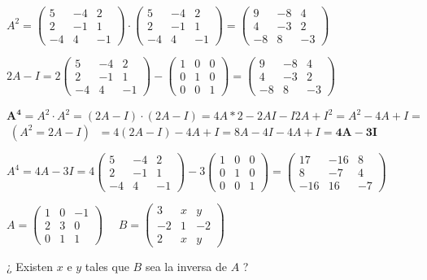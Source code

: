 \begin{proofw}\renewcommand{\qedsymbol}{$\diamond$}
	 $A^2=\left( \begin{matrix} 5&-4&2\\2&-1&1\\-4&4&-1 \end{matrix}\right)\cdot \left( \begin{matrix} 5&-4&2\\2&-1&1\\-4&4&-1 \end{matrix}\right)=\left( \begin{matrix}  9&-8&4\\4&-3&2\\-8&8&-3 \end{matrix}\right)$
 
\noindent  $2A-I=2\left( \begin{matrix} 5&-4&2\\2&-1&1\\-4&4&-1 \end{matrix}\right)-\left( \begin{matrix} 1&0&0\\0&1&0\\0&0&1 \end{matrix}\right)=\left( \begin{matrix} 9&-8&4\\4&-3&2\\-8&8&-3 \end{matrix}\right)$
 
 \noindent $\boldsymbol{A^4=}A^2\cdot A^2=(2A-I)\cdot (2A-I)=4A*2-2AI-I2A+I^2=A^2-4A+I=$ \textcolor{gris}{$\; (A^2=2A-I) \;$} $=4(2A-I)-4A+I=8A-4I-4A+I=\boldsymbol{4A-3I}$
 
\noindent $A^4=4A-3I=4\left( \begin{matrix} 5&-4&2\\2&-1&1\\-4&4&-1 \end{matrix}\right)-3\left( \begin{matrix} 1&0&0\\0&1&0\\0&0&1 \end{matrix}\right)
 =\left( \begin{matrix} 17&-16&8\\8&-7&4\\-16&16&-7  \end{matrix}\right)$
\end{proofw}

\begin{ejre}
$A=\left( \begin{array}{ccc} 1&0&-1\\2&3&0\\0&1&1   \end{array} \right) $
$\quad B=\left( \begin{array}{ccc} 3&x&y \\-2&1&-2 \\2 &x &y   \end{array} \right) $

\noindent ¿ Existen $x$ e $y$ tales que $B$ sea la inversa de $A$ ?
	
\end{ejre}

